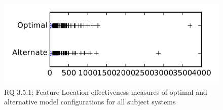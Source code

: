 
\begin{figure}
\centering
\includegraphics[height=0.4\textheight]{figures/combo/flt_rq1_tiny}
\caption{RQ 3.5.1: Feature Location effectiveness measures of optimal and alternative model configurations for all subject systems}
\label{fig:combo:flt:rq1:tiny}
\end{figure}
